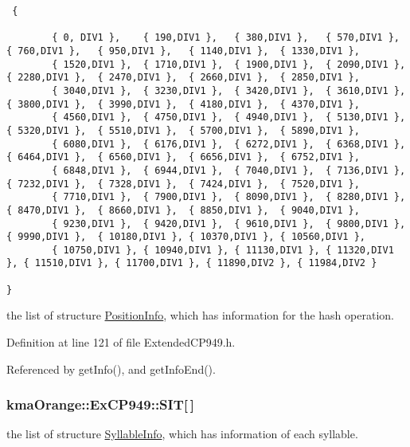 \begin{Code}\begin{verbatim} {

        { 0, DIV1 },    { 190,DIV1 },   { 380,DIV1 },   { 570,DIV1 },   { 760,DIV1 },   { 950,DIV1 },   { 1140,DIV1 },  { 1330,DIV1 },
        { 1520,DIV1 },  { 1710,DIV1 },  { 1900,DIV1 },  { 2090,DIV1 },  { 2280,DIV1 },  { 2470,DIV1 },  { 2660,DIV1 },  { 2850,DIV1 },
        { 3040,DIV1 },  { 3230,DIV1 },  { 3420,DIV1 },  { 3610,DIV1 },  { 3800,DIV1 },  { 3990,DIV1 },  { 4180,DIV1 },  { 4370,DIV1 },
        { 4560,DIV1 },  { 4750,DIV1 },  { 4940,DIV1 },  { 5130,DIV1 },  { 5320,DIV1 },  { 5510,DIV1 },  { 5700,DIV1 },  { 5890,DIV1 },
        { 6080,DIV1 },  { 6176,DIV1 },  { 6272,DIV1 },  { 6368,DIV1 },  { 6464,DIV1 },  { 6560,DIV1 },  { 6656,DIV1 },  { 6752,DIV1 },
        { 6848,DIV1 },  { 6944,DIV1 },  { 7040,DIV1 },  { 7136,DIV1 },  { 7232,DIV1 },  { 7328,DIV1 },  { 7424,DIV1 },  { 7520,DIV1 },
        { 7710,DIV1 },  { 7900,DIV1 },  { 8090,DIV1 },  { 8280,DIV1 },  { 8470,DIV1 },  { 8660,DIV1 },  { 8850,DIV1 },  { 9040,DIV1 },
        { 9230,DIV1 },  { 9420,DIV1 },  { 9610,DIV1 },  { 9800,DIV1 },  { 9990,DIV1 },  { 10180,DIV1 }, { 10370,DIV1 }, { 10560,DIV1 },
        { 10750,DIV1 }, { 10940,DIV1 }, { 11130,DIV1 }, { 11320,DIV1 }, { 11510,DIV1 }, { 11700,DIV1 }, { 11890,DIV2 }, { 11984,DIV2 }

}
\end{verbatim}
\end{Code}
the list of structure \hyperlink{structkmaOrange_1_1PositionInfo}{PositionInfo}, which has information for the hash operation. 



Definition at line 121 of file ExtendedCP949.h.

Referenced by getInfo(), and getInfoEnd().\hypertarget{classkmaOrange_1_1ExCP949_c314ba60fe83622b74f43e1b1611b2ae}{
\subsubsection[{SIT}]{ {\bf kmaOrange::ExCP949::SIT}\mbox{[}$\,$\mbox{]}}}
\label{classkmaOrange_1_1ExCP949_c314ba60fe83622b74f43e1b1611b2ae}


the list of structure \hyperlink{structkmaOrange_1_1SyllableInfo}{SyllableInfo}, which has information of each syllable. 



